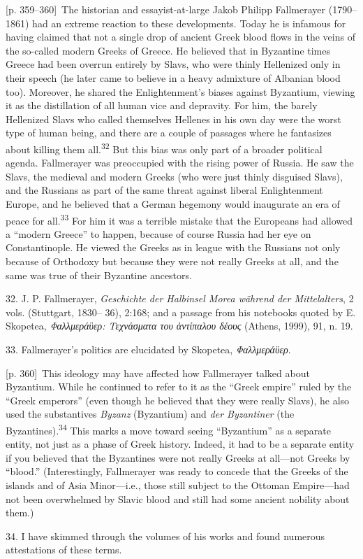 \documentclass[10pt,a4paper]{article}
\begin{document}
{\scriptsize\color{gray}[p. 359–360]}\ The historian and essayist-at-large Jakob Philipp Fallmerayer (1790–1861) had an extreme reaction to these developments. Today he is infamous for having claimed that not a single drop of ancient Greek blood flows in the veins of the so-called modern Greeks of Greece. He believed that in Byzantine times Greece had been overrun entirely by Slavs, who were thinly Hellenized only in their speech (he later came to believe in a heavy admixture of Albanian blood too). Moreover, he shared the Enlightenment’s biases against Byzantium, viewing it as the distillation of all human vice and depravity. For him, the barely Hellenized Slavs who called themselves Hellenes in his own day were the worst type of human being, and there are a couple of passages where he fantasizes about killing them all.\nobreak\textsuperscript{32} But this bias was only part of a broader political agenda. Fallmerayer was preoccupied with the rising power of Russia. He saw the Slavs, the medieval and modern Greeks (who were just thinly disguised Slavs), and the Russians as part of the same threat against liberal Enlightenment Europe, and he believed that a German hegemony would inaugurate an era of peace for all.\nobreak\textsuperscript{33} For him it was a terrible mistake that the Europeans had allowed a “modern Greece” to happen, because of course Russia had her eye on Constantinople. He viewed the Greeks as in league with the Russians not only because of Orthodoxy but because they were not really Greeks at all, and the same was true of their Byzantine ancestors.\par{\small 32. J. P. Fallmerayer, \textit{Geschichte der Halbinsel Morea während der Mittelalters}, 2 vols. (Stuttgart, 1830– 36), 2:168; and a passage from his notebooks quoted by E. Skopetea, \textit{Φαλλμεράϋερ: Τεχνάσματα του ἀντίπαλου δέους} (Athens, 1999), 91, n. 19.\par}{\small 33. Fallmerayer’s politics are elucidated by Skopetea, \textit{Φαλλμεράϋερ}.\par}
{\scriptsize\color{gray}[p. 360]}\ This ideology may have affected how Fallmerayer talked about Byzantium. While he continued to refer to it as the “Greek empire” ruled by the “Greek emperors” (even though he believed that they were really Slavs), he also used the substantives \textit{Byzanz} (Byzantium) and \textit{der Byzantiner} (the Byzantines).\nobreak\textsuperscript{34} This marks a move toward seeing “Byzantium” as a separate entity, not just as a phase of Greek history. Indeed, it had to be a separate entity if you believed that the Byzantines were not really Greeks at all—not Greeks by “blood.” (Interestingly, Fallmerayer was ready to concede that the Greeks of the islands and of Asia Minor—i.e., those still subject to the Ottoman Empire—had not been overwhelmed by Slavic blood and still had some ancient nobility about them.)\par{\small 34. I have skimmed through the volumes of his works and found numerous attestations of these terms.\par}
\end{document}
